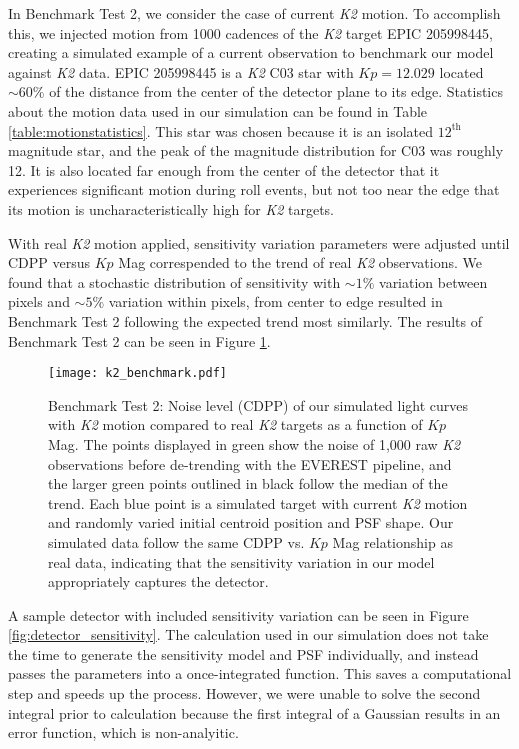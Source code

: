 \documentclass[12pt,preprint]{aastex}
\begin{document}
In Benchmark Test 2, we consider the case of current \textit{K2} motion. To accomplish this, we injected motion from 1000 cadences of the \textit{K2} target EPIC 205998445, creating a simulated example of a current observation to benchmark our model against \textit{K2} data. EPIC 205998445 is a \textit{K2} C03 star with $Kp = 12.029$ located ${\sim}60\%$ of the distance from the center of the detector plane to its edge. Statistics about the motion data used in our simulation can be found in Table \ref{table:motionstatistics}. This star was chosen because it is an isolated $12^{\text{th}}$ magnitude star, and the peak of the magnitude distribution for C03 was roughly 12. It is also located far enough from the center of the detector that it experiences significant motion during roll events, but not too near the edge that its motion is uncharacteristically high for \textit{K2} targets.

With real \textit{K2} motion applied, sensitivity variation parameters were adjusted until CDPP versus $Kp$ Mag correspended to the trend of real \textit{K2} observations. We found that a stochastic distribution of sensitivity with ${\sim}1\%$ variation between pixels and ${\sim}5\%$ variation within pixels, from center to edge resulted in Benchmark Test 2 following the expected trend most similarly. The results of Benchmark Test 2 can be seen in Figure \ref{fig:1motion}.

\begin{figure}[h]
	\centering
	\texttt{[image: k2\_benchmark.pdf]}
	\caption{Benchmark Test 2: Noise level (CDPP) of our simulated light curves with \textit{K2} motion compared to real \textit{K2} targets as a function of $Kp$ Mag. The points displayed in green show the noise of 1,000 raw \textit{K2} observations before de-trending with the EVEREST pipeline, and the larger green points outlined in black follow the median of the trend. Each blue point is a simulated target with current \textit{K2} motion and randomly varied initial centroid position and PSF shape. Our simulated data follow the same CDPP vs. $Kp$ Mag relationship as real data, indicating that the sensitivity variation in our model appropriately captures the detector.}
	\label{fig:1motion}
\end{figure}

A sample detector with included sensitivity variation can be seen in Figure \ref{fig:detector_sensitivity}. The calculation used in our simulation does not take the time to generate the sensitivity model and PSF individually, and instead passes the parameters into a once-integrated function. This saves a computational step and speeds up the process. However, we were unable to solve the second integral prior to calculation because the first integral of a Gaussian results in an error function, which is non-analyitic.
\end{document}
